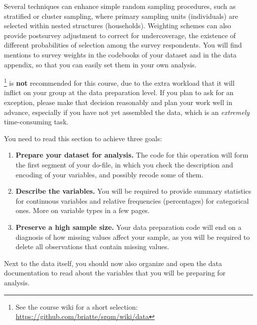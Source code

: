 Several techniques can enhance simple random sampling procedures, such as stratified or cluster sampling, where primary sampling units (\eg individuals) are selected within nested structures (\eg households). Weighting schemes can also provide postsurvey adjustment to correct for undercoverage, \ie the existence of different probabilities of selection among the survey respondents. You will find mentions to survey weights in the codebooks of your dataset and in the data appendix, so that you can easily set them in your own analysis.%

\label{external-data-warning}%
%
	\footnote{See the course wiki for a short selection: \url{https://github.com/briatte/srqm/wiki/data}} %
  is \textbf{not} recommended for this course, due to the extra workload that it will inflict on your group at the data preparation level. If you plan to ask for an exception, please make that decision reasonably and plan your work well in advance, especially if you have not yet assembled the data, which is an \emph{extremely} time-consuming task. %

You need to read this section to achieve three goals:

\begin{enumerate}
	\item \textbf{Prepare your dataset for analysis.} The code for this operation will form the first segment of your do-file, in which you check the description and encoding of your variables, and possibly recode some of them.
	\item \textbf{Describe the variables.} You will be required to provide summary statistics for continuous variables and relative frequencies (percentages) for categorical ones. More on variable types in a few pages.
	\item \textbf{Preserve a high sample size.} Your data preparation code will end on a diagnosis of how missing values affect your sample, as you will be required to delete all observations that contain missing values.
\end{enumerate}
   
Next to the data itself, you should now also organize and open the data documentation to read about the variables that you will be preparing for analysis.%

%
%
%
%
%
%
%

\stopcontents[chapters]

%
%
